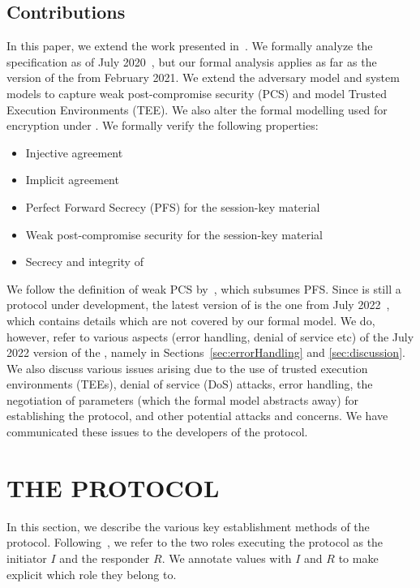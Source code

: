 \documentclass[runningheads]{llncs}
\begin{document}
\subsection{Contributions}
\label{sec:contributions}
In this paper, we extend the work presented in~\cite{Norr21}.
%
We formally analyze the \mEdhoc{} specification as of July
2020~\cite{our-analysis-selander-lake-edhoc-00}, but our formal analysis applies as far as the version of the \mSpec{} from February 2021.
%
We extend the adversary model and \mTamarin{} system models to capture weak
post-compromise security (PCS) and model Trusted Execution Environments
(TEE).
%
We also alter the formal modelling used for encryption under \mXor{}.
%
We formally verify the following properties:
\begin{itemize}
\item Injective agreement
\item Implicit agreement
\item Perfect Forward Secrecy (PFS) for the session-key material
\item Weak post-compromise security for the session-key material
\item Secrecy and integrity of \mADthree
\end{itemize}
%
We follow the definition of weak PCS by~\cite{DBLP:conf/csfw/Cohn-GordonCG16},
which subsumes PFS.
%
Since \mEdhoc{} is still a protocol under development, the latest version of \mEdhoc{} is the one from July 2022~\cite{draft-ietf-lake-edhoc-15}, which contains details which are not covered by our formal model.
%
We do, however, refer to various aspects
(error handling, denial of service etc) of the July 2022 version of the \mSpec{}, namely 
in Sections~\ref{sec:errorHandling} and \ref{sec:discussion}.
%
We also discuss various issues arising due to the use of trusted
execution environments (TEEs), denial of service (DoS) attacks, error handling,
the negotiation of parameters (which the formal model abstracts
away) for establishing the protocol, and other potential attacks and concerns.
%
We have communicated these issues to the developers of the protocol.
%

\section{\uppercase{The \mEdhoc{} Protocol}}
\label{sec:edhoc}
In this section, we describe the various key establishment methods of the
\mEdhoc{} protocol.
%
Following~\cite{Norr21}, we refer to the two roles executing the protocol as
the initiator $I$ and the responder $R$.
%
We annotate values with $I$ and $R$ to make explicit which role they belong
to.
%
\end{document}
